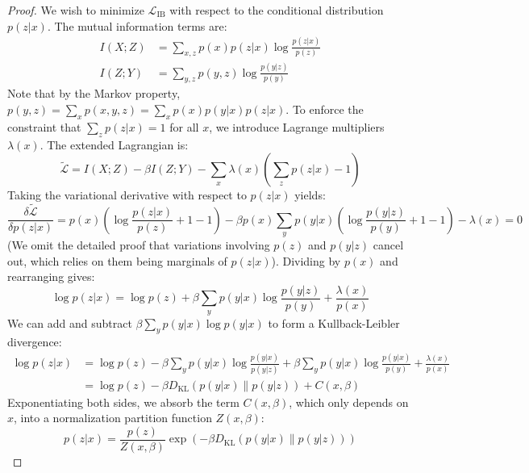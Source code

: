 \begin{proof}
    We wish to minimize $\mathcal{L}_{\text{IB}}$ with respect to the conditional distribution $p(z|x)$. The mutual information terms are:
    \begin{align}
        I(X; Z) &= \sum_{x,z} p(x) p(z|x) \log \frac{p(z|x)}{p(z)} \\
        I(Z; Y) &= \sum_{y,z} p(y,z) \log \frac{p(y|z)}{p(y)}
    \end{align}
    Note that by the Markov property, $p(y, z) = \sum_x p(x, y, z) = \sum_x p(x) p(y|x) p(z|x)$. 
    To enforce the constraint that $\sum_z p(z|x) = 1$ for all $x$, we introduce Lagrange multipliers $\lambda(x)$. The extended Lagrangian is:
    \begin{equation}
        \tilde{\mathcal{L}} = I(X; Z) - \beta I(Z; Y) - \sum_x \lambda(x) \left( \sum_z p(z|x) - 1 \right)
    \end{equation}
    Taking the variational derivative with respect to $p(z|x)$ yields:
    \begin{equation}
        \frac{\delta \tilde{\mathcal{L}}}{\delta p(z|x)} = p(x) \left( \log \frac{p(z|x)}{p(z)} + 1 - 1 \right) - \beta p(x) \sum_y p(y|x) \left( \log \frac{p(y|z)}{p(y)} + 1 - 1 \right) - \lambda(x) = 0
    \end{equation}
    (We omit the detailed proof that variations involving $p(z)$ and $p(y|z)$ cancel out, which relies on them being marginals of $p(z|x)$). Dividing by $p(x)$ and rearranging gives:
    \begin{equation}
        \log p(z|x) = \log p(z) + \beta \sum_y p(y|x) \log \frac{p(y|z)}{p(y)} + \frac{\lambda(x)}{p(x)}
    \end{equation}
    We can add and subtract $\beta \sum_y p(y|x) \log p(y|x)$ to form a Kullback-Leibler divergence:
    \begin{align*}
        \log p(z|x) &= \log p(z) - \beta \sum_y p(y|x) \log \frac{p(y|x)}{p(y|z)} + \beta \sum_y p(y|x) \log \frac{p(y|x)}{p(y)} + \frac{\lambda(x)}{p(x)} \\
        &= \log p(z) - \beta D_{\text{KL}}(p(y|x) \parallel p(y|z)) + C(x, \beta)
    \end{align*}
    Exponentiating both sides, we absorb the term $C(x, \beta)$, which only depends on $x$, into a normalization partition function $Z(x, \beta)$:
    \begin{equation}
        p(z|x) = \frac{p(z)}{Z(x, \beta)} \exp\left(-\beta D_{\text{KL}}(p(y|x) \parallel p(y|z))\right)
    \end{equation}
\end{proof}

